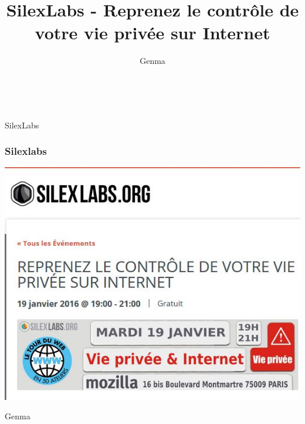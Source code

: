 \documentclass{beamer}
\title[SilexLabs]{SilexLabs - Reprenez le contrôle de votre vie privée sur Internet}
\author{Genma}
\begin{document}
\begin{frame}
	\titlepage
	\vfill
	\begin{center}
		\\[2.5ex]
		{\tiny\CcNote{\CcLongnameByNcSa}}
		\vspace*{-2.5ex}
	\end{center}
\end{frame}

\begin{frame}
\begin{center}
\Huge{SilexLabs}
\end{center}
\end{frame}
\begin{frame}
\frametitle{Silexlabs}

\begin{center}
\includegraphics[scale=0.6] {./images/silexlabs.jpg}
\end{center}
\end{frame}

\begin{frame}
\begin{center}
\Huge{Genma}
\end{center}
\end{frame}
\end{document}
